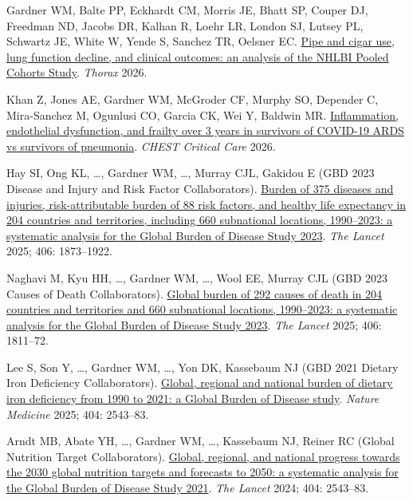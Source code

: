 \documentclass[11pt,article,oneside]{memoir}
\begin{document}
\begin{publist}
\item {\minbold Gardner WM}, Balte PP, Eckhardt CM, Morris JE, Bhatt SP, Couper DJ, Freedman ND, Jacobs DR, Kalhan R, Loehr LR, London SJ, Lutsey PL, Schwartz JE, White W, Yende S, Sanchez TR, Oelsner EC. \href{https://doi.org/10.1136/thorax-2025-224461}{Pipe and cigar use, lung function decline, and clinical outcomes: an analysis of the NHLBI Pooled Cohorts Study}. \emph{Thorax} 2026.

\item Khan Z, Jones AE, {\minbold Gardner WM}, McGroder CF, Murphy SO, Depender C, Mira-Sanchez M, Ogunlusi CO, Garcia CK, Wei Y, Baldwin MR. \href{https://doi.org/10.1016/j.chstcc.2026.100265}{Inflammation, endothelial dysfunction, and frailty over 3 years in survivors of COVID-19 ARDS vs survivors of pneumonia}. \emph{CHEST Critical Care} 2026.

\item Hay SI, Ong KL, \ldots, {\minbold Gardner WM}, \ldots, Murray CJL, Gakidou E (GBD 2023 Disease and Injury and Risk Factor Collaborators). \href{https://doi.org/10.1016/S0140-6736(25)01637-X}{Burden of 375 diseases and injuries, risk-attributable burden of 88 risk factors, and healthy life expectancy in 204 countries and territories, including 660 subnational locations, 1990–2023: a systematic analysis for the Global Burden of Disease Study 2023}. \emph{The Lancet} 2025; 406: 1873--1922.

\item Naghavi M, Kyu HH, \ldots, {\minbold Gardner WM}, \ldots, Wool EE, Murray CJL (GBD 2023 Causes of Death Collaborators). \href{https://doi.org/10.1016/S0140-6736(25)01917-8}{Global burden of 292 causes of death in 204 countries and territories and 660 subnational locations, 1990–2023: a systematic analysis for the Global Burden of Disease Study 2023}. \emph{The Lancet} 2025; 406: 1811--72.

\item Lee S, Son Y, \ldots, {\minbold Gardner WM}, \ldots, Yon DK, Kassebaum NJ (GBD 2021 Dietary Iron Deficiency Collaborators). \href{https://doi.org/10.1038/s41591-025-03624-8}{Global, regional and national burden of dietary iron deficiency from 1990 to 2021: a Global Burden of Disease study}. \emph{Nature Medicine} 2025; 404: 2543--83.

\item Arndt MB, Abate YH, \ldots, {\minbold Gardner WM}, \ldots, Kassebaum NJ, Reiner RC (Global Nutrition Target Collaborators). \href{https://doi.org/10.1016/S0140-6736(24)01821-X}{Global, regional, and national progress towards the 2030 global nutrition targets and forecasts to 2050: a systematic analysis for the Global Burden of Disease Study 2021}. \emph{The Lancet} 2024; 404: 2543--83.


\end{publist}
\end{document}
